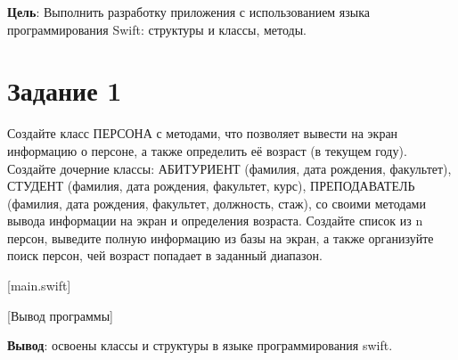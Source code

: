 \documentclass{bsuir}
\begin{document}
\maketitle
\mainmatter
\renewcommand{\thefigure}{\arabic{figure}}
\renewcommand{\thelisting}{\arabic{listing}}

\textbf{Цель}: Выполнить разработку приложения с использованием языка
программирования Swift: структуры и классы, методы.

\section*{Задание 1}

Создайте класс ПЕРСОНА с методами, что позволяет вывести на экран информацию о
персоне, а также определить её возраст (в текущем году). Создайте дочерние
классы: АБИТУРИЕНТ (фамилия, дата рождения, факультет), СТУДЕНТ (фамилия, дата
рождения, факультет, курс), ПРЕПОДАВАТЕЛЬ (фамилия, дата рождения, факультет,
должность, стаж), со своими методами вывода информации на экран и определения
возраста. Создайте список из n персон, выведите полную информацию из базы на
экран, а также организуйте поиск персон, чей возраст попадает в заданный
диапазон.

[main.swift]

[Вывод программы]

\textbf{Вывод}: освоены классы и структуры в языке программирования swift.
\end{document}
